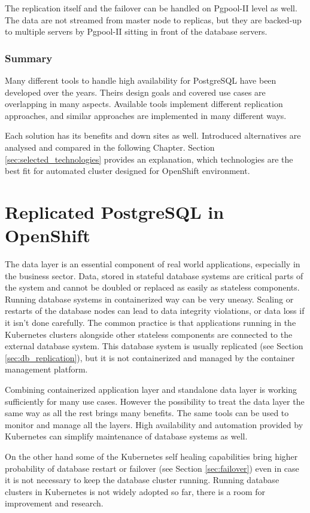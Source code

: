 \documentclass[
  digital, %
  twoside, %
  table,   %
  lof,     %
  lot,     %
]{fithesis3}
\begin{document}
The replication itself and the failover can be handled on Pgpool-II level as well. The data are not streamed from master node to replicas, but they are backed-up to multiple servers by Pgpool-II sitting in front of the database servers.

\subsection{Summary}
Many different tools to handle high availability for PostgreSQL have been developed over the years. Theirs design goals and covered use cases are overlapping in many aspects. Available tools implement different replication approaches, and similar approaches are implemented in many different ways.

Each solution has its benefits and down sites as well. Introduced alternatives are analysed and compared in the following Chapter. Section \ref{sec:selected_technologies} provides an explanation, which technologies are the best fit for automated cluster designed for OpenShift environment.

\chapter{Replicated PostgreSQL in OpenShift} \label{chap:pg_in_openshift}
The data layer is an essential component of real world applications, especially in the business sector. Data, stored in stateful database systems are critical parts of the system and cannot be doubled or replaced as easily as stateless components. Running database systems in containerized way can be very uneasy. Scaling or restarts of the database nodes can lead to data integrity violations, or data loss if it isn't done carefully. The common practice is that applications running in the Kubernetes clusters alongside other stateless components are connected to the external database system. This database system is usually replicated (see Section \ref{sec:db_replication}), but it is not containerized and managed by the container management platform.

Combining containerized application layer and standalone data layer is working sufficiently for many use cases. However the possibility to treat the data layer the same way as all the rest brings many benefits. The same tools can be used to monitor and manage all the layers. High availability and automation provided by Kubernetes can simplify maintenance of database systems as well.

On the other hand some of the Kubernetes self healing capabilities bring higher probability of database restart or failover (see Section \ref{sec:failover}) even in case it is not necessary to keep the database cluster running. Running database clusters in Kubernetes is not widely adopted so far, there is a room for improvement and research.
\end{document}
